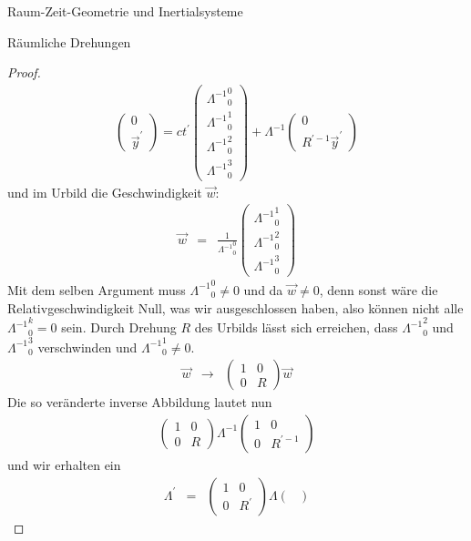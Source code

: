 \begin{chapter}{\titlestr}
\begin{section}{Raum-Zeit-Geometrie und Inertialsysteme}
\begin{subsection}{Räumliche Drehungen}
\begin{proof}
\begin{eqnarray*}
\begin{pmatrix}
0\\
\vec{y}^\prime
\end{pmatrix}
=
ct^\prime\begin{pmatrix}
{\Lambda^{-1}}^0_0\\
{\Lambda^{-1}}^1_0\\
{\Lambda^{-1}}^2_0\\
{\Lambda^{-1}}^3_0
\end{pmatrix}
+
\Lambda^{-1}
\begin{pmatrix}
0\\
R^{\prime-1}\vec{y}^\prime
\end{pmatrix}
\end{eqnarray*}
und im Urbild die Geschwindigkeit $\vec{w}$:
\begin{eqnarray*}
\vec{w} &=& \frac{1}{{\Lambda^{-1}}^0_0}\begin{pmatrix}
{\Lambda^{-1}}^1_0\\
{\Lambda^{-1}}^2_0\\
{\Lambda^{-1}}^3_0
\end{pmatrix}
\end{eqnarray*}
Mit dem selben Argument muss ${\Lambda^{-1}}^0_0\ne 0$ und da $\vec{w}\ne 0$, denn sonst wäre die Relativgeschwindigkeit Null, was wir ausgeschlossen haben, also können nicht alle ${\Lambda^{-1}}^k_0=0$ sein. Durch Drehung $R$ des Urbilds lässt sich erreichen, dass ${\Lambda^{-1}}^2_0$ und ${\Lambda^{-1}}^3_0$ verschwinden und ${\Lambda^{-1}}^1_0\ne 0$.
\begin{eqnarray*}
\vec{w} &\rightarrow& \begin{pmatrix}
1 & 0\\
0 & R
\end{pmatrix}
\vec{w}
\end{eqnarray*}
Die so veränderte inverse Abbildung lautet nun
\begin{eqnarray*}
\begin{pmatrix}
1 & 0\\
0 & R
\end{pmatrix}
\Lambda^{-1}
\begin{pmatrix}
1 & 0\\
0 & R^{\prime-1}
\end{pmatrix}
\end{eqnarray*}
und wir erhalten ein
\begin{eqnarray*}
\Lambda^\prime &=&
\begin{pmatrix}
1 & 0\\
0 & R^\prime
\end{pmatrix}
\Lambda
\begin{pmatrix}

\end{pmatrix}
\end{eqnarray*}
\end{proof}
\end{subsection}
\end{section}
\end{chapter}
